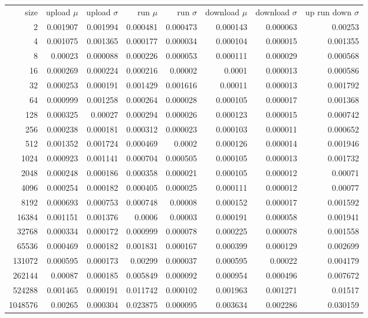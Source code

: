\begin{tabular}{r r r r r r r r}
size & upload $\mu$  & upload $\sigma$ & run $\mu$ & run $\sigma$ & download $\mu$ & download $\sigma$ & up run down $\sigma$ \\
2 & 0.001907 & 0.001994 & 0.000481 & 0.000473 & 0.000143 & 0.000063 & 0.00253 \\
4 & 0.001075 & 0.001365 & 0.000177 & 0.000034 & 0.000104 & 0.000015 & 0.001355 \\
8 & 0.00023 & 0.000088 & 0.000226 & 0.000053 & 0.000111 & 0.000029 & 0.000568 \\
16 & 0.000269 & 0.000224 & 0.000216 & 0.00002 & 0.0001 & 0.000013 & 0.000586 \\
32 & 0.000253 & 0.000191 & 0.001429 & 0.001616 & 0.00011 & 0.000013 & 0.001792 \\
64 & 0.000999 & 0.001258 & 0.000264 & 0.000028 & 0.000105 & 0.000017 & 0.001368 \\
128 & 0.000325 & 0.00027 & 0.000294 & 0.000026 & 0.000123 & 0.000015 & 0.000742 \\
256 & 0.000238 & 0.000181 & 0.000312 & 0.000023 & 0.000103 & 0.000011 & 0.000652 \\
512 & 0.001352 & 0.001724 & 0.000469 & 0.0002 & 0.000126 & 0.000014 & 0.001946 \\
1024 & 0.000923 & 0.001141 & 0.000704 & 0.000505 & 0.000105 & 0.000013 & 0.001732 \\
2048 & 0.000248 & 0.000186 & 0.000358 & 0.000021 & 0.000105 & 0.000012 & 0.00071 \\
4096 & 0.000254 & 0.000182 & 0.000405 & 0.000025 & 0.000111 & 0.000012 & 0.00077 \\
8192 & 0.000693 & 0.000753 & 0.000748 & 0.00008 & 0.000152 & 0.000017 & 0.001592 \\
16384 & 0.001151 & 0.001376 & 0.0006 & 0.00003 & 0.000191 & 0.000058 & 0.001941 \\
32768 & 0.000334 & 0.000172 & 0.000999 & 0.000078 & 0.000225 & 0.000078 & 0.001558 \\
65536 & 0.000469 & 0.000182 & 0.001831 & 0.000167 & 0.000399 & 0.000129 & 0.002699 \\
131072 & 0.000595 & 0.000173 & 0.00299 & 0.000037 & 0.000595 & 0.00022 & 0.004179 \\
262144 & 0.00087 & 0.000185 & 0.005849 & 0.000092 & 0.000954 & 0.000496 & 0.007672 \\
524288 & 0.001465 & 0.000191 & 0.011742 & 0.000102 & 0.001963 & 0.001271 & 0.01517 \\
1048576 & 0.00265 & 0.000304 & 0.023875 & 0.000095 & 0.003634 & 0.002286 & 0.030159 \\

\end{tabular}
